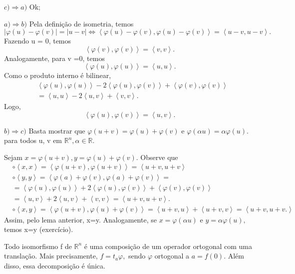 \documentclass[algebra_notes.tex]{subfiles}
\begin{document}
\begin{proof*}
	$c)\Rightarrow a)$ Ok;

	$a)\Rightarrow b)$ Pela definição de isometria, temos
	$$
		|\varphi (u)-\varphi (v)| = |u-v| \Longleftrightarrow \left< \varphi (u)-\varphi (v), \varphi (u)-\varphi (v) \right> =
		\left< u-v, u-v \right>.
	$$
	Fazendo u = 0, temos
	$$
		\left< \varphi (v), \varphi (v) \right> = \left< v, v \right>.
	$$
	Analogamente, para v =0, temos
	$$
		\left< \varphi (u), \varphi (u) \right> = \left< u, u \right>.
	$$
	Como o produto interno é bilinear,
	\begin{align*}
		 & \left< \varphi (u), \varphi (u) \right> - 2\left< \varphi (u), \varphi (v) \right> + \left< \varphi (v), \varphi (v) \right> \\
		 & =\left< u, u \right> - 2\left< u, v \right> + \left< v, v \right>.
	\end{align*}
	Logo,
	$$
		\left< \varphi (u), \varphi (v) \right> = \left< u, v \right>.
	$$

	$b)\Rightarrow c)$ Basta mostrar que $\varphi (u+v)=\varphi (u)+\varphi (v)$ e $\varphi (\alpha u) = \alpha \varphi (u).$
	para todos u, v em $\mathbb{R}^{n}, \alpha \in \mathbb{R}.$

	Sejam $x=\varphi (u+v), y=\varphi (u)+\varphi (v).$ Observe que
	\begin{align*}
		 & \circ{}\left< x, x \right>=\left< \varphi (u+v), \varphi (u+v) \right> = \left< u+v, u+v \right>                                                      \\
		 & \circ{}\left< y, y \right> = \left< \varphi (a)+\varphi (v), \varphi (a)+\varphi (v) \right> =                                                        \\
		 & =\left< \varphi (u), \varphi (u) \right> + 2\left< \varphi (u),\varphi (v) \right> + \left< \varphi (v), \varphi (v) \right>                          \\
		 & =\left< u, v \right> +2\left< u, v \right> + \left< v, v \right> = \left< u+v, u+v \right>.                                                           \\
		 & \circ{}\left< x, y \right>=\left< \varphi (u+v), \varphi (u)+\varphi (v) \right>=\left< u+v, u \right>+\left< u+v, v \right>=\left< u+v, u+v. \right>
	\end{align*}
	Assim, pelo lema anterior, x=y. Analogamente, se $x=\varphi (\alpha u)$ e $y=\alpha \varphi (u),$ temos x=y (exercício). \qedsymbol
\end{proof*}
\begin{crl*}
	Todo isomorfismo f de $\mathbb{R}^{n}$ é uma composição de um operador ortogonal com uma translação. Mais precisamente,
	$f=t_{a}\varphi,$ sendo $\varphi $ ortogonal a $a=f(0).$ Além disso, essa decomposição é única.
\end{crl*}
\end{document}
